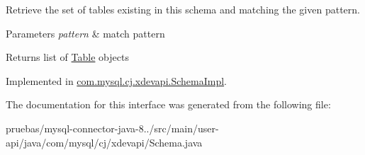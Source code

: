 Retrieve the set of tables existing in this schema and matching the given pattern.


\begin{DoxyParams}{Parameters}
{\em pattern} & match pattern \\
\hline
\end{DoxyParams}
\begin{DoxyReturn}{Returns}
list of \mbox{\hyperlink{interfacecom_1_1mysql_1_1cj_1_1xdevapi_1_1_table}{Table}} objects 
\end{DoxyReturn}


Implemented in \mbox{\hyperlink{classcom_1_1mysql_1_1cj_1_1xdevapi_1_1_schema_impl_ae9ce3609e108dc05f1e4ca978d490b81}{com.\+mysql.\+cj.\+xdevapi.\+Schema\+Impl}}.



The documentation for this interface was generated from the following file\+:\begin{DoxyCompactItemize}
\item 
pruebas/mysql-\/connector-\/java-\/8../src/main/user-\/api/java/com/mysql/cj/xdevapi/Schema.\+java\end{DoxyCompactItemize}

